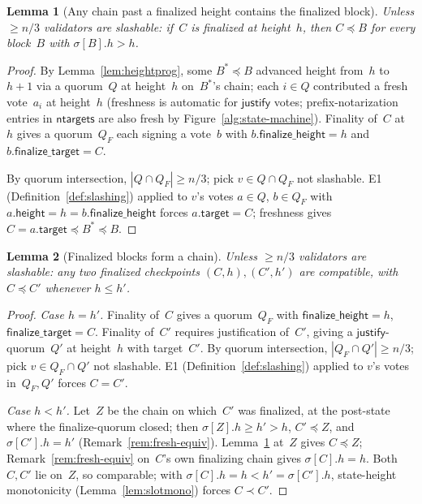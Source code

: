 \documentclass{article}
\newcommand{\target}{\mathsf{target}}
\newcommand{\height}{\mathsf{height}}
\newcommand{\just}{\ensuremath{\mathsf{justify}}\xspace}
\newcommand{\finalizeHeight}{\mathsf{finalize\_height}}
\newcommand{\finalizeTarget}{\mathsf{finalize\_target}}
\newcommand{\ntargets}{\mathsf{ntargets}}
\theoremstyle{plain}
\newtheorem{lemma}{Lemma}
\theoremstyle{definition}
\theoremstyle{remark}
\begin{document}
\begin{lemma}[Any chain past a finalized height contains the finalized block]\label{lem:mainsafety}
Unless $\geq n/3$ validators are slashable: if~$C$ is finalized at height~$h$, then $C \preceq B$ for every block~$B$ with $\sigma[B].h > h$.
\end{lemma}

\begin{proof}
By Lemma~\ref{lem:heightprog}, some $B^* \preceq B$ advanced height from~$h$ to~$h+1$ via a quorum~$Q$ at height~$h$ on~$B^*$'s chain; each $i \in Q$ contributed a fresh vote~$a_i$ at height~$h$ (freshness is automatic for \just votes; prefix-notarization entries in $\ntargets$ are also fresh by Figure~\ref{alg:state-machine}).
Finality of~$C$ at~$h$ gives a quorum~$Q_F$ each signing a vote~$b$ with $b.\finalizeHeight = h$ and $b.\finalizeTarget = C$.

By quorum intersection, $|Q \cap Q_F| \geq n/3$; pick $v \in Q \cap Q_F$ not slashable.
E1 (Definition~\ref{def:slashing}) applied to $v$'s votes $a \in Q$, $b \in Q_F$ with $a.\height = h = b.\finalizeHeight$ forces $a.\target = C$; freshness gives $C = a.\target \preceq B^* \preceq B$.
\end{proof}

\begin{lemma}[Finalized blocks form a chain]\label{lem:finchain}
Unless $\geq n/3$ validators are slashable: any two finalized checkpoints $(C, h), (C', h')$ are compatible, with $C \preceq C'$ whenever $h \leq h'$.
\end{lemma}

\begin{proof}
\emph{Case $h = h'$.}
Finality of~$C$ gives a quorum~$Q_F$ with $\finalizeHeight = h$, $\finalizeTarget = C$.
Finality of~$C'$ requires justification of~$C'$, giving a \just-quorum~$Q'$ at height~$h$ with target~$C'$.
By quorum intersection, $|Q_F \cap Q'| \geq n/3$; pick $v \in Q_F \cap Q'$ not slashable.
E1 (Definition~\ref{def:slashing}) applied to $v$'s votes in~$Q_F, Q'$ forces $C = C'$.

\emph{Case $h < h'$.}
Let~$Z$ be the chain on which~$C'$ was finalized, at the post-state where the finalize-quorum closed; then $\sigma[Z].h \geq h' > h$, $C' \preceq Z$, and $\sigma[C'].h = h'$ (Remark~\ref{rem:fresh-equiv}).
Lemma~\ref{lem:mainsafety} at~$Z$ gives $C \preceq Z$; Remark~\ref{rem:fresh-equiv} on~$C$'s own finalizing chain gives $\sigma[C].h = h$.
Both~$C, C'$ lie on~$Z$, so comparable; with $\sigma[C].h = h < h' = \sigma[C'].h$, state-height monotonicity (Lemma~\ref{lem:slotmono}) forces $C \prec C'$.
\end{proof}
\end{document}
